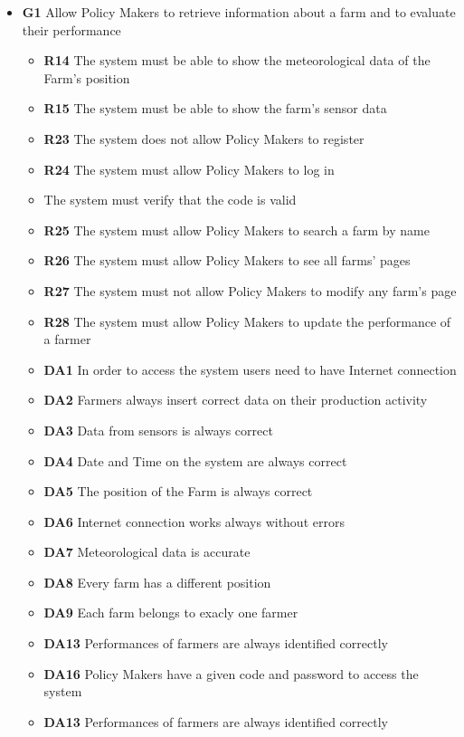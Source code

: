 \begin{itemize}   
\item \textbf{G1} Allow Policy Makers to retrieve information about a farm and to evaluate their performance
    \begin{itemize}
        \renewcommand\labelitemi{--}
        \item \textbf{R14} The system must be able to show the meteorological data of the Farm’s position
        \item \textbf{R15} The system must be able to show the farm’s sensor data
        \item \textbf{R23} The system does not allow Policy Makers to register
        \item \textbf{R24} The system must allow Policy Makers to log in
        \item \textbf{} The system must verify that the code is valid
        \item \textbf{R25} The system must allow Policy Makers to search a farm by name
        \item \textbf{R26} The system must allow Policy Makers to see all farms’ pages
        \item \textbf{R27} The system must not allow Policy Makers to modify any farm’s page
        \item \textbf{R28} The system must allow Policy Makers to update the performance of a farmer
        \item \textbf{DA1} In order to access the system users need to have Internet connection
        \item \textbf{DA2} Farmers always insert correct data on their production activity
        \item \textbf{DA3} Data from sensors is always correct
        \item \textbf{DA4} Date and Time on the system are always correct
        \item \textbf{DA5} The position of the Farm is always correct
        \item \textbf{DA6} Internet connection works always without errors
        \item \textbf{DA7} Meteorological data is accurate
        \item \textbf{DA8} Every farm has a different position
        \item \textbf{DA9} Each farm belongs to exacly one farmer
        \item \textbf{DA13} Performances of farmers are always identified correctly
        \item \textbf{DA16} Policy Makers have a given code and password to access the system
        \item \textbf{DA13} Performances of farmers are always identified correctly
    \end{itemize}


\end{itemize}
